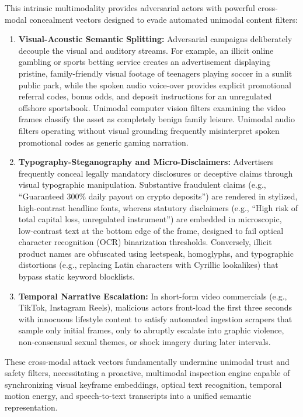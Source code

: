 \documentclass[12pt,a4paper]{report}
\begin{document}
This intrinsic multimodality provides adversarial actors with powerful cross-modal concealment vectors designed to evade automated unimodal content filters:
\begin{enumerate}
    \item \textbf{Visual-Acoustic Semantic Splitting:} Adversarial campaigns deliberately decouple the visual and auditory streams. For example, an illicit online gambling or sports betting service creates an advertisement displaying pristine, family-friendly visual footage of teenagers playing soccer in a sunlit public park, while the spoken audio voice-over provides explicit promotional referral codes, bonus odds, and deposit instructions for an unregulated offshore sportsbook. Unimodal computer vision filters examining the video frames classify the asset as completely benign family leisure. Unimodal audio filters operating without visual grounding frequently misinterpret spoken promotional codes as generic gaming narration.
    \item \textbf{Typography-Steganography and Micro-Disclaimers:} Advertisers frequently conceal legally mandatory disclosures or deceptive claims through visual typographic manipulation. Substantive fraudulent claims (e.g., ``Guaranteed 300\% daily payout on crypto deposits'') are rendered in stylized, high-contrast headline fonts, whereas statutory disclaimers (e.g., ``High risk of total capital loss, unregulated instrument'') are embedded in microscopic, low-contrast text at the bottom edge of the frame, designed to fail optical character recognition (OCR) binarization thresholds. Conversely, illicit product names are obfuscated using leetspeak, homoglyphs, and typographic distortions (e.g., replacing Latin characters with Cyrillic lookalikes) that bypass static keyword blocklists.
    \item \textbf{Temporal Narrative Escalation:} In short-form video commercials (e.g., TikTok, Instagram Reels), malicious actors front-load the first three seconds with innocuous lifestyle content to satisfy automated ingestion scrapers that sample only initial frames, only to abruptly escalate into graphic violence, non-consensual sexual themes, or shock imagery during later intervals.
\end{enumerate}

These cross-modal attack vectors fundamentally undermine unimodal trust and safety filters, necessitating a proactive, multimodal inspection engine capable of synchronizing visual keyframe embeddings, optical text recognition, temporal motion energy, and speech-to-text transcripts into a unified semantic representation.
\end{document}
